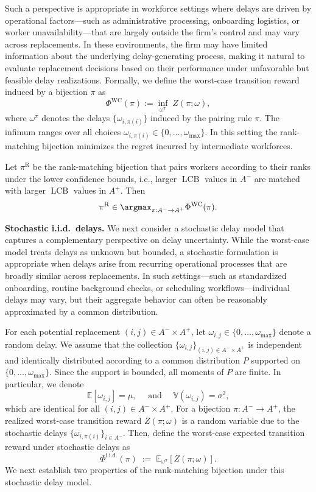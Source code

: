 \documentclass[opre,blindrev]{informs3}
\newcommand{\LCB}{\operatorname{LCB}}
\newcommand{\bbE}[2]{{{\mathbb{E}_{#1}\left[#2\right]}}}
\begin{document}
\begin{APPENDICES}
Such a perspective is appropriate in workforce settings where delays are driven by operational factors—such as administrative processing, onboarding logistics, or worker unavailability—that are largely outside the firm's control and may vary across replacements. In these environments, the firm may have limited information about the underlying delay-generating process, making it natural to evaluate replacement decisions based on their performance under unfavorable but feasible delay realizations. Formally, we define the worst-case transition reward induced by a bijection \(\pi\) as
\[\Phi^{\mathrm{WC}}(\pi):=\inf_{\omega^\pi}\;Z(\pi;\omega ),\]
where \(\omega^\pi\) denotes the delays \(\{\omega_{i,\pi(i)}\}\) induced by the pairing rule \(\pi\). The infimum ranges over all choices \(\omega_{i,\pi(i)} \in \{0,\dots,\omega_{\max}\}\). In this setting the rank-matching bijection minimizes the regret incurred by intermediate workforces.

\begin{proposition}
\label{lem:wc-rank-matching}
    Let \(\pi^{\mathrm{R}}\) be the rank-matching bijection that pairs workers according to their ranks under the lower confidence bounds, i.e., larger \(\LCB\) values in \(A^-\) are matched with larger \(\LCB\) values in \(A^+\). Then
    \[
    \pi^{\mathrm{R}} \in \argmax_{\pi : A^- \to A^+} \Phi^{\mathrm{WC}}(\pi).
    \]
\end{proposition}

{\bf Stochastic i.i.d.\ delays.}
We next consider a stochastic delay model that captures a complementary perspective on delay uncertainty. While the worst-case model treats delays as unknown but bounded, a stochastic formulation is appropriate when delays arise from recurring operational processes that are broadly similar across replacements. In such settings—such as standardized onboarding, routine background checks, or scheduling workflows—individual delays may vary, but their aggregate behavior can often be reasonably approximated by a common distribution.

For each potential replacement \((i,j)\in A^-\times A^+\), let \(\omega_{i,j}\in\{0,\dots,\omega_{\max}\}\) denote a random delay. We assume that the collection \(\{\omega_{i,j}\}_{(i,j)\in A^-\times A^+}\) is independent and identically distributed according to a common distribution \(P\) supported on \(\{0,\dots,\omega_{\max}\}\). Since the support is bounded, all moments of \(P\) are finite. In particular, we denote
\[\mathbb{E}[\omega_{i,j}] = \mu, \quad \text{ and } \quad \mathbb{V}(\omega_{i,j}) = \sigma^2, \]
which are identical for all \((i,j)\in A^{-}\times A^+\). For a bijection \(\pi:A^-\to A^+\), the realized worst-case transition reward \(Z(\pi;\omega )\) is a random variable due to the stochastic delays \(\{\omega_{i,\pi(i)}\}_{i\in A^-}\). Then, define the worst-case expected transition reward under stochastic delays as
\[ \Phi^{\mathrm{i.i.d.}}(\pi) \;:=\; \bbE{\omega^{\pi}}{Z(\pi;\omega)}.\]
We next establish two properties of the rank-matching bijection under this stochastic delay model.


\end{APPENDICES}
\end{document}
